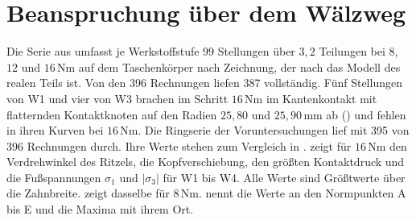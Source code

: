 
\section{Beanspruchung über dem Wälzweg}
\label{sec:waelzweg}

Die Serie aus  umfasst je Werkstoffstufe 99 Stellungen über $3{,}2$ Teilungen bei $8$, $12$ und $16$\,Nm auf dem Taschenkörper nach Zeichnung, der nach  das Modell des realen Teils ist. Von den 396 Rechnungen liefen 387 vollständig. Fünf Stellungen von W1 und vier von W3 brachen im Schritt $16$\,Nm im Kantenkontakt mit flatternden Kontaktknoten auf den Radien $25{,}80$ und $25{,}90$\,mm ab () und fehlen in ihren Kurven bei $16$\,Nm. Die Ringserie der Voruntersuchungen lief mit 395 von 396 Rechnungen durch. Ihre Werte stehen zum Vergleich in .  zeigt für $16$\,Nm den Verdrehwinkel des Ritzels, die Kopfverschiebung, den größten Kontaktdruck und die Fußspannungen $\sigma_{\mathrm{1}}$ und $|\sigma_{\mathrm{3}}|$ für W1 bis W4. Alle Werte sind Größtwerte über die Zahnbreite.  zeigt dasselbe für $8$\,Nm.  nennt die Werte an den Normpunkten A bis E und die Maxima mit ihrem Ort.

